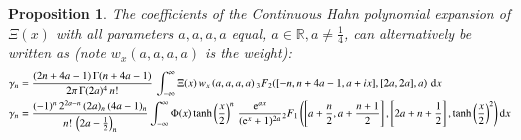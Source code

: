 \documentclass[a4paper,11pt,twoside]{amsart}
\newtheorem{proposition}[theorem]{Proposition}
\begin{document}
\begin{proposition}
The coefficients of the Continuous Hahn polynomial expansion of $\Xi(x)$ with all parameters $a,a,a,a$ equal, $a \in \mathbb{R}, a \ne \frac14$, can alternatively be written as (note $w_x(a,a,a,a)$ is the weight): 
\begin{align}
\gamma_n &= \frac{(2n+4a-1)\,\Gamma(n+4a-1)}{2\pi\,\Gamma(2a)^4\,n!}\,\int_{-\infty}^{\infty} \Xi(x)\,w_x\left(a,a,a,a)\,{}_3F_2([-n,n+4a-1,a+ix],[2a,2a],a\right)\,\mathrm{d}x \\
\gamma_n &= \frac{(-1)^n\,2^{2a-n}\,(2a)_n\,(4a-1)_n}{n!\,\left(2a-\frac12\right)_n}\int_{-\infty}^{\infty} \Phi(x)\tanh\left(\frac{x}{2}\right)^{n}\,\frac{\mathrm{e}^{ax}}{(\mathrm{e}^x+1)^{2a}}{}_2F_1\left(\left[a+\frac{n}{2}, a+\frac{n+1}{2}\right],\left[2a+n+\frac12\right],\tanh\left(\frac{x}{2}\right)^2\right)\mathrm{d}x \notag
\end{align}
\end{proposition}
\end{document}

